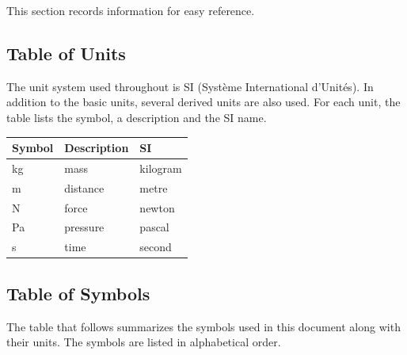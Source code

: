 \documentclass[12pt]{article}
\begin{document}
This section records information for easy reference.

\subsection{Table of Units}

The unit system used throughout is SI (Syst\`{e}me International d'Unit\'{e}s). In addition to the
basic units, several derived units are also used. For each unit, the table lists the symbol, a
description and the SI name.
~\newline

\renewcommand{\arraystretch}{1.2}
  \noindent \begin{tabular}{l l l} 
    \toprule		
    \textbf{Symbol} & \textbf{Description} & \textbf{SI}\\
    \midrule 
    \si{\kilogram} & mass & kilogram\\	
    \si{\meter} & distance & metre\\	
    \si{\newton} & force & newton\\	
    \si{\pascal} & pressure & pascal\\
    \si{\second} & time & second\\	
    \bottomrule
  \end{tabular}

\subsection{Table of Symbols}\label{TblSym}

The table that follows summarizes the symbols used in this document along with 
their units.  The symbols are listed in alphabetical order.
\newline

\renewcommand{\arraystretch}{1.2}
\end{document}
